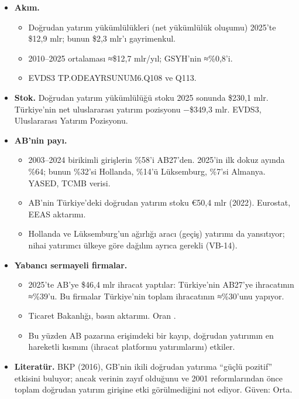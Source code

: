 \begin{itemize}
\tightlist
\item
  \textbf{Akım.}

  \begin{itemize}
  \tightlist
  \item
    Doğrudan yatırım yükümlülükleri (net yükümlülük oluşumu) 2025'te \$12,9 mlr; bunun \$2,3 mlr'ı gayrimenkul.
  \item
    2010--2025 ortalaması ≈\$12,7 mlr/yıl; GSYH'nin ≈\%0,8'i.
  \item
    \etiketV{} EVDS3 TP.ODEAYRSUNUM6.Q108 ve Q113.
  \end{itemize}
\item
  \textbf{Stok.} Doğrudan yatırım yükümlülüğü stoku 2025 sonunda \$230,1 mlr. Türkiye'nin net uluslararası yatırım pozisyonu −\$349,3 mlr. \etiketV{} EVDS3, Uluslararası Yatırım Pozisyonu.
\item
  \textbf{AB'nin payı.}

  \begin{itemize}
  \tightlist
  \item
    2003--2024 birikimli girişlerin \%58'i AB27'den. 2025'in ilk dokuz ayında \%64; bunun \%32'si Hollanda, \%14'ü Lüksemburg, \%7'si Almanya. \etiketD{} YASED, TCMB verisi.
  \item
    AB'nin Türkiye'deki doğrudan yatırım stoku €50,4 mlr (2022). \etiketV{} Eurostat, EEAS aktarımı.
  \item
    Hollanda ve Lüksemburg'un ağırlığı aracı (geçiş) yatırımı da yansıtıyor; nihai yatırımcı ülkeye göre dağılım ayrıca gerekli (VB-14).
  \end{itemize}
\item
  \textbf{Yabancı sermayeli firmalar.}

  \begin{itemize}
  \tightlist
  \item
    2025'te AB'ye \$46,4 mlr ihracat yaptılar: Türkiye'nin AB27'ye ihracatının ≈\%39'u. Bu firmalar Türkiye'nin toplam ihracatının ≈\%30'unu yapıyor.
  \item
    \etiketV{} Ticaret Bakanlığı, basın aktarımı. Oran \etiketT{}.
  \item
    Bu yüzden AB pazarına erişimdeki bir kayıp, doğrudan yatırımın en hareketli kısmını (ihracat platformu yatırımlarını) etkiler.
  \end{itemize}
\item
  \textbf{Literatür.} BKP (2016), GB'nin ikili doğrudan yatırıma ``güçlü pozitif'' etkisini buluyor; ancak verinin zayıf olduğunu ve 2001 reformlarından önce toplam doğrudan yatırım girişine etki görülmediğini not ediyor. \etiketV{} Güven: Orta.
\end{itemize}

